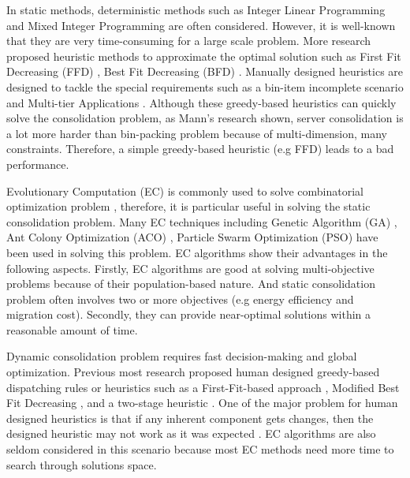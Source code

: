 In static methods, deterministic methods such as  
Integer Linear Programming \cite{Speitkamp:2010ck} and Mixed
Integer Programming \cite{Wang:2016eh} are often considered. However, it is well-known that they are very time-consuming for a large scale problem. More research proposed heuristic methods
 to approximate the optimal solution such as 
First Fit Decreasing (FFD) \cite{Panigrahy:2011wk}, Best Fit Decreasing (BFD) \cite{Beloglazov:2012ji}.
Manually designed heuristics are designed to tackle the special requirements such 
as a bin-item incomplete scenario \cite{Gupta:2008ul} and Multi-tier Applications \cite{Jung:2008vb, Li:2009wf}. Although these greedy-based heuristics can quickly solve the consolidation problem,  as Mann's research \cite{Mann:2015ua} shown, server consolidation is a lot more harder than bin-packing problem because of multi-dimension, many constraints. Therefore, a simple greedy-based heuristic (e.g FFD) leads to a bad performance. 

Evolutionary Computation (EC) is commonly used to solve combinatorial optimization problem \cite{Guzek:2015ds}, therefore, it is particular useful in solving the static consolidation problem.  Many EC techniques including Genetic Algorithm (GA) \cite{Xu:2010vh}, Ant Colony Optimization (ACO) \cite{Gao:2013gg, Mateos:2013bm}, Particle Swarm Optimization (PSO) \cite{Jeyarani:2012fg} have been used in solving this problem. EC algorithms show their advantages in the following aspects. Firstly, EC algorithms are good at solving multi-objective problems because of their population-based nature. And static consolidation problem often involves two or more objectives (e.g energy efficiency and migration cost). Secondly,  they can provide near-optimal solutions within a reasonable amount of time.  

Dynamic consolidation problem requires fast decision-making and global optimization. Previous most research proposed human designed greedy-based dispatching rules or heuristics such as a First-Fit-based approach \cite{Bobroff:2007ec}, Modified Best Fit Decreasing \cite{Beloglazov:2012ji}, and a two-stage heuristic \cite{Zhang:2015jm}. One of the major problem for human designed heuristics is that if any inherent component gets changes, then the designed heuristic may not work as it was expected \cite{SoteloFigueroa:2013be}. EC algorithms are also seldom considered in this scenario because most EC methods need more time to search through solutions space.

